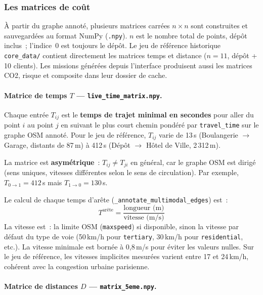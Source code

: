\documentclass[a4paper, 12pt, twoside]{article}
\begin{document}
\subsubsection{Les matrices de co\^{u}t}

\`{A} partir du graphe annot\'{e}, plusieurs matrices carr\'{e}es $n \times n$ sont construites
et sauvegard\'{e}es au format NumPy (\texttt{.npy}). $n$ est le nombre total de points,
d\'{e}p\^{o}t inclus~; l'indice~0 est toujours le d\'{e}p\^{o}t. Le jeu de r\'{e}f\'{e}rence
historique \texttt{core\_data/} contient directement les matrices temps et distance
($n = 11$, d\'{e}p\^{o}t + 10 clients). Les missions g\'{e}n\'{e}r\'{e}es depuis l'interface
produisent aussi les matrices CO2, risque et composite dans leur dossier de cache.

\paragraph{Matrice de temps $T$ --- \texttt{live\_time\_matrix.npy}.}

Chaque entr\'{e}e $T_{ij}$ est le \textbf{temps de trajet minimal en secondes} pour aller
du point $i$ au point $j$ en suivant le plus court chemin pond\'{e}r\'{e} par
\texttt{travel\_time} sur le graphe OSM annot\'{e}. Pour le jeu de r\'{e}f\'{e}rence,
$T_{ij}$ varie de 13\,s (Boulangerie $\rightarrow$ Garage, distants de 87\,m) \`{a} 412\,s
(D\'{e}p\^{o}t $\rightarrow$ H\^{o}tel de Ville, 2\,312\,m).

La matrice est \textbf{asym\'{e}trique}~: $T_{ij} \neq T_{ji}$ en g\'{e}n\'{e}ral, car le
graphe OSM est dirig\'{e} (sens uniques, vitesses diff\'{e}rentes selon le sens de circulation).
Par exemple, $T_{0 \rightarrow 1} = 412$\,s mais $T_{1 \rightarrow 0} = 130$\,s.

Le calcul de chaque temps d'ar\^{e}te (\texttt{\_annotate\_multimodal\_edges}) est~:
\[
  T^{\text{ar\^{e}te}} = \frac{\text{longueur (m)}}{\text{vitesse (m/s)}}
\]
La vitesse est~: la limite OSM (\texttt{maxspeed}) si disponible, sinon la vitesse par
d\'{e}faut du type de voie (50\,km/h pour \texttt{tertiary}, 30\,km/h pour
\texttt{residential}, etc.). La vitesse minimale est born\'{e}e \`{a} 0,8\,m/s pour
\'{e}viter les valeurs nulles. Sur le jeu de r\'{e}f\'{e}rence, les vitesses implicites
mesur\'{e}es varient entre 17 et 24\,km/h, coh\'{e}rent avec la congestion urbaine parisienne.

\paragraph{Matrice de distances $D$ --- \texttt{matrix\_5eme.npy}.}
\end{document}
